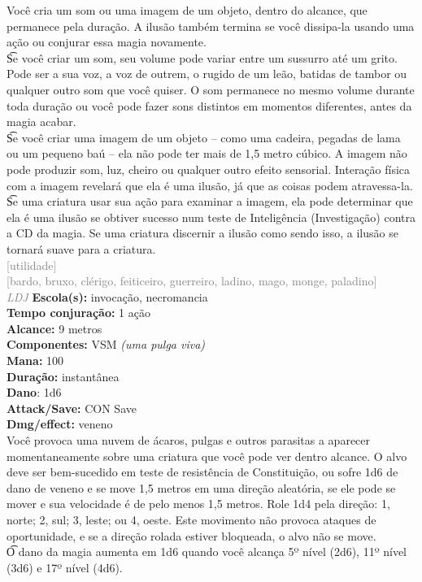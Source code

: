 \documentclass{RPG_Adventure}[2021/10/20]
\begin{document}
{\normalsize Você cria um som ou uma imagem de um objeto, dentro do alcance, que permanece pela duração. A ilusão também termina se você dissipa-la usando uma ação ou conjurar essa magia novamente.\\\t Se você criar um som, seu volume pode variar entre um sussurro até um grito. Pode ser a sua voz, a voz de outrem, o rugido de um leão, batidas de tambor ou qualquer outro som que você quiser. O som permanece no mesmo volume durante toda duração ou você pode fazer sons distintos em momentos diferentes, antes da magia acabar.\\\t Se você criar uma imagem de um objeto – como uma cadeira, pegadas de lama ou um pequeno baú – ela não pode ter mais de 1,5 metro cúbico. A imagem não pode produzir som, luz, cheiro ou qualquer outro efeito sensorial. Interação física com a imagem revelará que ela é uma ilusão, já que as coisas podem atravessa-la.\\\t Se uma criatura usar sua ação para examinar a imagem, ela pode determinar que ela é uma ilusão se obtiver sucesso num teste de Inteligência (Investigação) contra a CD da magia. Se uma criatura discernir a ilusão como sendo isso, a ilusão se tornará suave para a criatura.\\}
{\scriptsize \textcolor{gray}{[utilidade]\\}}
{\scriptsize \textcolor{gray}{[bardo, bruxo, clérigo, feiticeiro, guerreiro, ladino, mago, monge, paladino]\\}}
{\tiny \textcolor{gray}{\textit{LDJ}}}
{\small \t \textbf{Escola(s):} invocação, necromancia\\\t \textbf{Tempo conjuração:} 1 ação\\\t \textbf{Alcance:} 9 metros\\\t \textbf{Componentes:} VSM \textit{(uma pulga viva)}\\\t \textbf{Mana:} 100\\\t \textbf{Duração:} instantânea\\\t \textbf{Dano}: 1d6\\\t \textbf{Attack/Save:} CON Save\\\t \textbf{Dmg/effect:} veneno\\}
{\normalsize Você provoca uma nuvem de ácaros, pulgas e outros parasitas a aparecer momentaneamente sobre uma criatura que você pode ver dentro alcance. O alvo deve ser bem-sucedido em teste de resistência de  Constituição, ou sofre 1d6 de dano de veneno e se move 1,5 metros em uma direção aleatória, se ele pode se mover e sua velocidade é de pelo menos 1,5 metros. Role 1d4 pela direção: 1, norte; 2, sul; 3, leste; ou 4, oeste. Este movimento não provoca ataques de oportunidade, e se a direção rolada estiver bloqueada, o alvo não se move.\\\t O dano da magia aumenta em 1d6 quando você alcança 5º nível (2d6), 11º nível (3d6) e 17º nível (4d6).\\}
\end{document}
